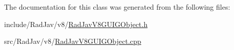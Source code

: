 The documentation for this class was generated from the following files\+:\begin{DoxyCompactItemize}
\item 
include/\+Rad\+Jav/v8/\mbox{\hyperlink{_rad_jav_v8_g_u_i_g_object_8h}{Rad\+Jav\+V8\+G\+U\+I\+G\+Object.\+h}}\item 
src/\+Rad\+Jav/v8/\mbox{\hyperlink{_rad_jav_v8_g_u_i_g_object_8cpp}{Rad\+Jav\+V8\+G\+U\+I\+G\+Object.\+cpp}}\end{DoxyCompactItemize}
